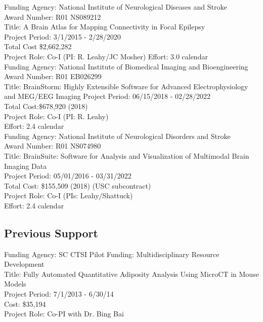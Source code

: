 \documentclass[overlapped,line,letterpaper]{res}
\begin{document}
\begin{resume}
Funding Agency:  National Institute of Neurological Diseases and Stroke\\
Award Number: R01 NS089212\\
Title: A Brain Atlas for Mapping Connectivity in Focal Epilepsy\\
Project Period: 3/1/2015 - 2/28/2020\\
Total Cost \$2,662,282 \\
Project Role: Co-I (PI: R. Leahy/JC Mosher)
Effort: 3.0 calendar\\

Funding Agency: National Institute of Biomedical Imaging and Bioengineering\\
Award Number: R01 EB026299 \\
Title: BrainStorm: Highly Extensible Software for Advanced Electrophysiology and MEG/EEG Imaging
Project Period: 06/15/2018 - 02/28/2022 \\
Total Cost:\$678,920 (2018)\\
Project Role: Co-I (PI: R. Leahy)\\
Effort: 2.4 calendar\\

Funding Agency: National Institute of Neurological Disorders and Stroke\\
Award Number: R01 NS074980 \\
Title: BrainSuite: Software for Analysis and Visualization of Multimodal Brain Imaging Data \\
Project Period: 05/01/2016 - 03/31/2022 \\
Total Cost: \$155,509 (2018) (USC subcontract) \\
Project Role: Co-I (PIs: Leahy/Shattuck)        \\                        
Effort: 2.4 calendar\\

\subsection{Previous Support}

Funding Agency: SC CTSI Pilot Funding: Multidisciplinary Resource Development\\
Title: Fully Automated Quantitative Adiposity Analysis Using MicroCT in Mouse Models\\
Project Period: 7/1/2013 - 6/30/14\\
Cost: \$35,194 \\
Project Role: Co-PI with Dr. Bing Bai\\


\end{resume}
\end{document}
